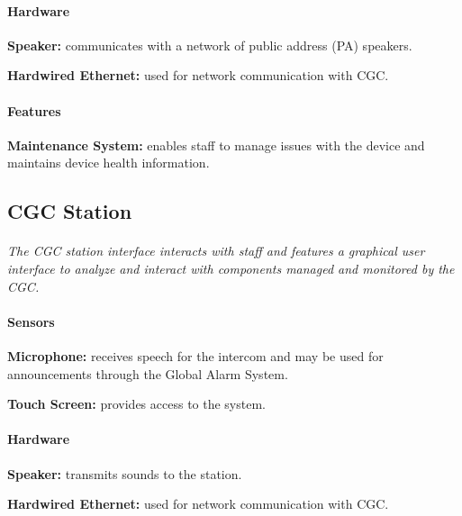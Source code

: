 \documentclass[12pt]{article}
\begin{document}
	\paragraph{Hardware}
	\begin{list}{}{}
		\item \textbf{Speaker:} communicates with a network of public address (PA) speakers.
		\item \textbf{Hardwired Ethernet:} used for network communication with CGC. 
	\end{list}
	
	\paragraph{Features}
	\begin{list}{}{}
		\item \textbf{Maintenance System:} enables staff to manage issues with the device	and 
		maintains device health information.
	\end{list}


	\subsection{CGC Station}
	\paragraph{} \textit{The CGC station interface interacts with staff and features a 
	graphical user interface to analyze and interact with components managed and monitored
	by the CGC.}		
	
	\paragraph{Sensors}
	\begin{list}{}{}
		\item \textbf{Microphone:} receives speech for the intercom and may be used 
		for announcements through the Global Alarm System.
		\item \textbf{Touch Screen:} provides access to the system.
	\end{list}
		
	\paragraph{Hardware}
	\begin{list}{}{}
		\item \textbf{Speaker:} transmits sounds to the station.
		\item \textbf{Hardwired Ethernet:} used for network communication with CGC. 
	\end{list}
	
\end{document}
